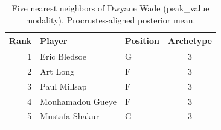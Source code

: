 \begin{table}[htbp]
  \centering\small
  \begin{tabular}{rllc}
    \toprule
    Rank & Player & Position & Archetype \\
    \midrule
    1 & Eric Bledsoe & G & 3 \\
    2 & Art Long & F & 3 \\
    3 & Paul Millsap & F & 3 \\
    4 & Mouhamadou Gueye & F & 3 \\
    5 & Mustafa Shakur & G & 3 \\
    \bottomrule
  \end{tabular}
  \caption{Five nearest neighbors of Dwyane Wade (peak_value modality), Procrustes-aligned posterior mean.}
  \label{tab:Dwyane_Wade_neighbors_peak_value}
\end{table}

